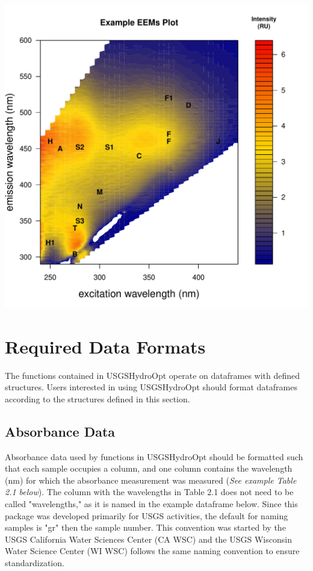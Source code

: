 \documentclass[a4paper,11pt]{article}\usepackage[]{graphicx}\usepackage[]{color}
\makeatletter
\def\maxwidth{ %
  \ifdim\Gin@nat@width>\linewidth
    \linewidth
  \else
    \Gin@nat@width
  \fi
}
\newenvironment{knitrout}{}{} %
\makeatother
\begin{document}
\begin{knitrout}
\color{fgcolor}
\includegraphics[width=\maxwidth]{figure/unnamed-chunk-3} 

\end{knitrout}

\section{Required Data Formats}
The functions contained in USGSHydroOpt operate on dataframes with defined structures. Users interested in using USGSHydroOpt should format dataframes according to the structures defined in this section.

\subsection{Absorbance Data}
Absorbance data used by functions in USGSHydroOpt should be formatted such that each sample occupies a column, and one column contains the wavelength (nm) for which the absorbance measurement was measured (\emph{See example Table 2.1 below}). The column with the wavelengths in Table 2.1 does not need to be called "wavelengths," as it is named in the example dataframe below. Since this package was developed primarily for USGS activities, the default for naming samples is "gr" then the sample number. This convention was started by the USGS California Water Sciences Center (CA WSC) and the USGS Wisconsin Water Science Center (WI WSC) follows the same naming convention to ensure standardization.
\end{document}

